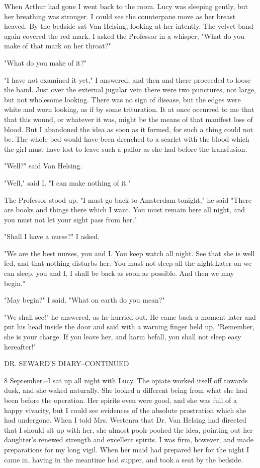 When Arthur had gone I went back to the room. Lucy was sleeping gently, but her breathing was stronger. I could see the counterpane move as her breast heaved. By the bedside sat Van Helsing, looking at her intently. The velvet band again covered the red mark. I asked the Professor in a whisper, "What do you make of that mark on her throat?" 

"What do you make of it?" 

"I have not examined it yet," I answered, and then and there proceeded to loose the band. Just over the external jugular vein there were two punctures, not large, but not wholesome looking. There was no sign of disease, but the edges were white and worn looking, as if by some trituration. It at once occurred to me that that this wound, or whatever it was, might be the means of that manifest loss of blood. But I abandoned the idea as soon as it formed, for such a thing could not be. The whole bed would have been drenched to a scarlet with the blood which the girl must have lost to leave such a pallor as she had before the transfusion. 

"Well?" said Van Helsing. 

"Well," said I. "I can make nothing of it." 

The Professor stood up. "I must go back to Amsterdam tonight," he said "There are books and things there which I want. You must remain here all night, and you must not let your sight pass from her." 

"Shall I have a nurse?" I asked. 

"We are the best nurses, you and I. You keep watch all night. See that she is well fed, and that nothing disturbs her. You must not sleep all the night.Later on we can sleep, you and I. I shall be back as soon as possible. And then we may begin." 

"May begin?" I said. "What on earth do you mean?" 

"We shall see!" he answered, as he hurried out. He came back a moment later and put his head inside the door and said with a warning finger held up, "Remember, she is your charge. If you leave her, and harm befall, you shall not sleep easy hereafter!" 

DR. SEWARD'S DIARY--CONTINUED 

8 September.--I sat up all night with Lucy. The opiate worked itself off towards dusk, and she waked naturally. She looked a different being from what she had been before the operation. Her spirits even were good, and she was full of a happy vivacity, but I could see evidences of the absolute prostration which she had undergone. When I told Mrs. Westenra that Dr. Van Helsing had directed that I should sit up with her, she almost pooh-poohed the idea, pointing out her daughter's renewed strength and excellent spirits. I was firm, however, and made preparations for my long vigil. When her maid had prepared her for the night I came in, having in the meantime had supper, and took a seat by the bedside. 

